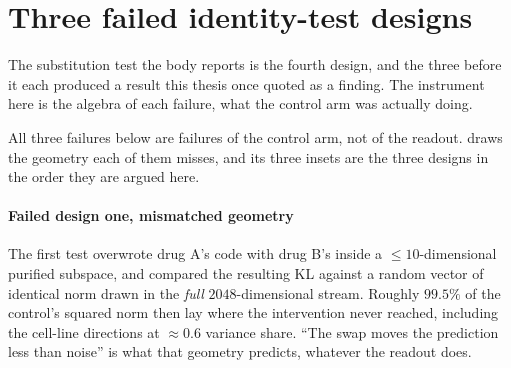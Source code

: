 
\framedecl{-}
\section{Three failed identity-test designs}
\label{sec:app-identity}

\begin{question}
The substitution test the body reports is the fourth design, and the three
before it each produced a result this thesis once quoted as a finding. The
instrument here is the algebra of each failure, what the control arm was
actually doing.
\end{question}

\noindent
All three failures below are failures of the control arm, not of the readout.
 draws the geometry each of them misses, and its three insets are
the three designs in the order they are argued here.



\paragraph{Failed design one, mismatched geometry} The first test overwrote drug
A's code with drug B's inside a $\leq 10$-dimensional purified subspace, and
compared the resulting KL against a random vector of identical norm drawn in the
\emph{full} $2048$-dimensional stream. Roughly $99.5\%$ of the control's
squared norm then lay where the intervention never reached, including the
cell-line directions at $\approx 0.6$ variance share. ``The swap moves the
prediction less than noise'' is what that geometry predicts, whatever the
readout does.

